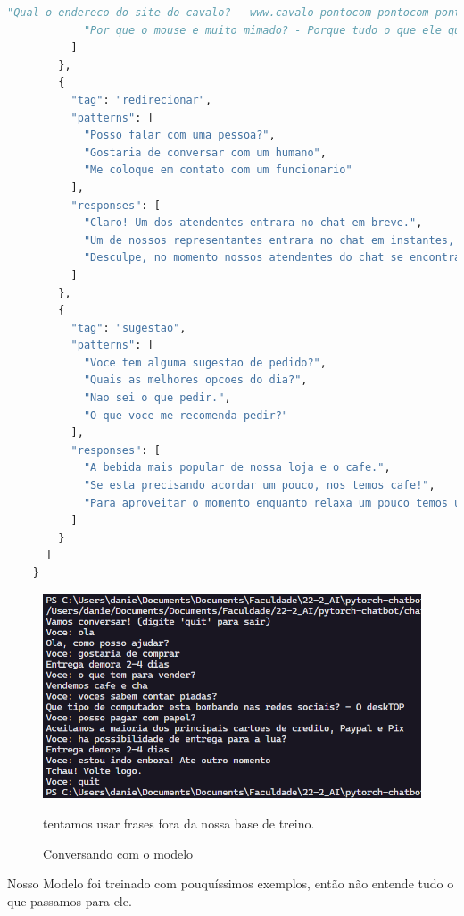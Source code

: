 \begin{lstlisting}[language=Python, caption= Dados de treino (completo)]
            "Qual o endereco do site do cavalo? - www.cavalo pontocom pontocom pontocom",
            "Por que o mouse e muito mimado? - Porque tudo o que ele quer, o mouse pad"
          ]
        },
        {
          "tag": "redirecionar",
          "patterns": [
            "Posso falar com uma pessoa?",
            "Gostaria de conversar com um humano",
            "Me coloque em contato com um funcionario"
          ],
          "responses": [
            "Claro! Um dos atendentes entrara no chat em breve.",
            "Um de nossos representantes entrara no chat em instantes, aguarde.",
            "Desculpe, no momento nossos atendentes do chat se encontram indisponiveis. Podemos tentar resolver seu pedido pelo chatbot ou tente entrar em contato mais tarde."
          ]
        },
        {
          "tag": "sugestao",
          "patterns": [
            "Voce tem alguma sugestao de pedido?",
            "Quais as melhores opcoes do dia?",
            "Nao sei o que pedir.",
            "O que voce me recomenda pedir?"
          ],
          "responses": [
            "A bebida mais popular de nossa loja e o cafe.",
            "Se esta precisando acordar um pouco, nos temos cafe!",
            "Para aproveitar o momento enquanto relaxa um pouco temos um otimo cha!"
          ]
        }
      ]
    }

\end{lstlisting}

\begin{figure}[H]
   \begin{center}
      \includegraphics[width=16cm]{img/chatting.png}
      \caption{Conversando com o modelo} \label{running}
      \medskip
      \small
      tentamos usar frases fora da nossa base de treino.
   \end{center}
\end{figure}

Nosso Modelo foi treinado com pouquíssimos exemplos, então não entende tudo o que passamos para ele.
